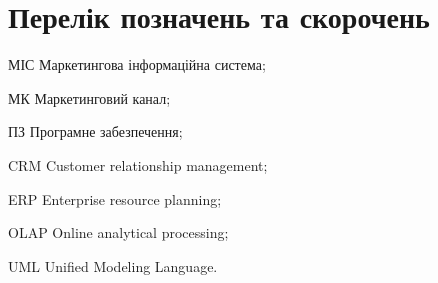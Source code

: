 \section*{Перелік позначень та скорочень}

\begin{abbrDescription}
\item[МІС] Маркетингова інформаційна система;
\item[МК] Маркетинговий канал;
\item[ПЗ] Програмне забезпечення;
\item[CRM] Customer relationship management;
\item[ERP] Enterprise resource planning;
\item[OLAP] Online analytical processing;
\item[UML] Unified Modeling Language.
\end{abbrDescription}

